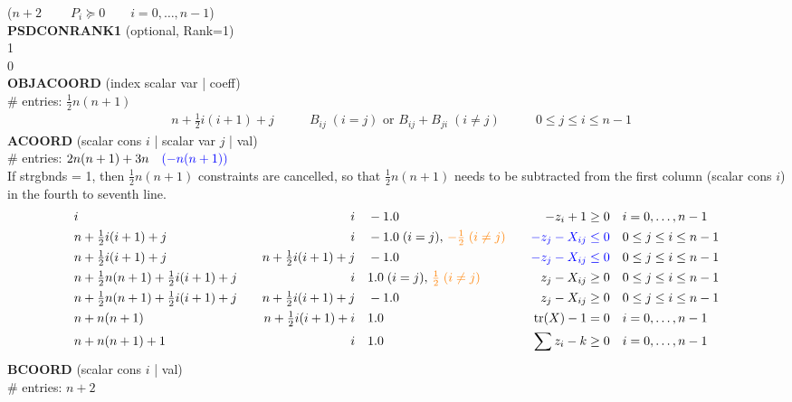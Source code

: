 \documentclass[11pt,a4paper]{article}
\DeclareMathOperator{\tr}{tr}
\theoremstyle{definition}
\begin{document}
{{\color{red}($n+2 \qquad \; P_i \succeq 0 \qquad i = 0,\dots,n-1$)} \\
{\color{green}\textbf{PSDCONRANK1} (optional, Rank=1) \\
1 \\
0\\}
\textbf{OBJACOORD} (index scalar var | coeff) \\
\# entries: $\tfrac{1}{2}n(n+1)$\\
\[
  \begin{aligned}
    &n+\tfrac{1}{2}i(i+1)+j \qquad & B_{ij} \; (i=j) \text{ or } B_{ij} +
    B_{ji} \; (i\neq j) \qquad & 0 \leq j \leq i \leq n-1
  \end{aligned}
\]
\textbf{ACOORD} (scalar cons $i$ | scalar var $j$ | val) \\
\# entries: $2n(n+1)+3n \quad {\color{blue} (- n(n+1))}$ \\
{\color{blue} If strgbnds = 1, then $\tfrac{1}{2}n(n+1)$ constraints are cancelled, so
  that $\tfrac{1}{2}n(n+1)$ needs to be subtracted from the first column
  (scalar cons $i$) in the fourth to seventh line.}
\[
  \begin{aligned}
    & i \quad & i \quad & -1.0 \quad & -z_i + 1 \geq 0 \quad & i =
    0,\dots,n-1 \\
    & n+\tfrac{1}{2}i(i+1)+j \quad & i \quad & -1.0\; (i = j),\,
    {\color{orange} -\tfrac{1}{2}\; (i\neq j)} \quad & {\color{blue}-z_j -
      X_{ij} \leq 0}
    \quad & 0 \leq j \leq i \leq n-1\\
    & n+\tfrac{1}{2}i(i+1)+j \quad & n+\tfrac{1}{2}i(i+1)+j \quad & -1.0
    \quad & {\color{blue}-z_j - X_{ij} \leq 0} \quad & 0 \leq j \leq i \leq n-1 \\
    & n+\tfrac{1}{2}n(n+1)+\tfrac{1}{2}i(i+1)+j \quad & i \quad & 1.0\; (i
    = j),\, {\color{orange} \tfrac{1}{2}\; (i\neq j)} \quad & z_j - X_{ij} \geq 0
    \quad & 0
    \leq j \leq i \leq n-1 \\
    & n+\tfrac{1}{2}n(n+1)+\tfrac{1}{2}i(i+1)+j \quad &
    n+\tfrac{1}{2}i(i+1)+j \quad & -1.0 \quad & z_j - X_{ij} \geq 0 \quad &
    0 \leq j \leq i \leq n-1 \\
    & n+n(n+1) \quad & n+\tfrac{1}{2}i(i+1)+i \quad & 1.0 \quad & \tr(X) -
    1 = 0 \quad & i = 0,\dots,n-1 \\
    & n+n(n+1)+1 \quad & i \quad & 1.0 \quad & \sum z_i - k \geq 0 \quad &
    i = 0,\dots,n-1
  \end{aligned}
\]
\textbf{BCOORD} (scalar cons $i$ | val) \\
\# entries: $n+2$ \\
}
\end{document}
